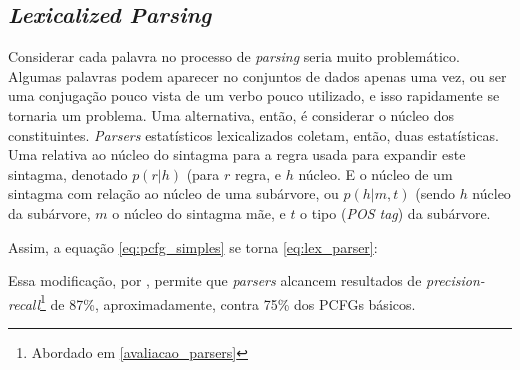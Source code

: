 \subsection{\textit{Lexicalized Parsing}}
\label{lexParsing}

Considerar cada palavra no processo de \textit{parsing} seria muito problemático. Algumas palavras podem aparecer no conjuntos de dados apenas uma vez, ou ser uma conjugação pouco vista de um verbo pouco utilizado, e isso rapidamente se tornaria um problema. Uma alternativa, então, é considerar o núcleo dos constituintes.  \textit{Parsers} estatísticos lexicalizados coletam, então, duas estatísticas. Uma relativa ao núcleo do sintagma para a regra usada para expandir este sintagma, denotado $p(r|h)$ (para $r$ regra, e $h$ núcleo. E o núcleo de um sintagma com relação ao núcleo de uma subárvore, ou $p(h|m,t)$ (sendo $h$ núcleo da subárvore, $m$ o núcleo do sintagma mãe, e $t$ o tipo (\textit{POS tag}) da subárvore. 

Assim, a equação \ref{eq:pcfg_simples} se torna \ref{eq:lex_parser}:
\begin{center}
    
\end{center}
Essa modificação, por , permite que \textit{parsers} alcancem resultados de \textit{precision-recall}\footnote{Abordado em \ref{avaliacao_parsers}} de 87\%, aproximadamente, contra 75\% dos PCFGs básicos.